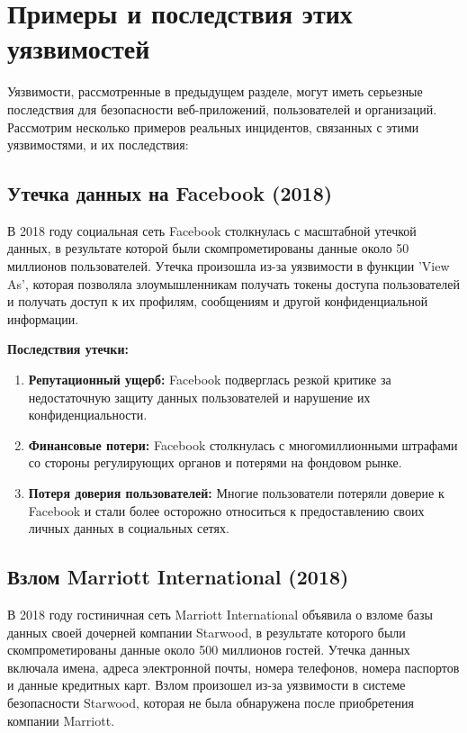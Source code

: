 \documentclass[a4paper,12pt]{diplom}
\begin{document}
	 
	 
	 
	 
	 
	 
	 
	 
	 
	 
	 
	 \section{Примеры и последствия этих уязвимостей}
	 
	 Уязвимости, рассмотренные в предыдущем разделе, могут иметь серьезные последствия для безопасности веб-приложений, пользователей и организаций. Рассмотрим несколько примеров реальных инцидентов, связанных с этими уязвимостями, и их последствия:
	 
	 \subsection{Утечка данных на Facebook (2018)}
	 
	 В 2018 году социальная сеть Facebook столкнулась с масштабной утечкой данных, в результате которой были скомпрометированы данные около 50 миллионов пользователей. Утечка произошла из-за уязвимости в функции 'View As', которая позволяла злоумышленникам получать токены доступа пользователей и получать доступ к их профилям, сообщениям и другой конфиденциальной информации.\cite{Facebook_attack}
	 
	 \textbf{Последствия утечки:}
	 
	 \begin{enumerate}[label=\arabic{enumi})]
	 	\item \textbf{Репутационный ущерб:}  Facebook подверглась резкой критике за недостаточную защиту данных пользователей и нарушение их конфиденциальности.
	 	\item \textbf{Финансовые потери:}  Facebook столкнулась с многомиллионными штрафами со стороны регулирующих органов и потерями на фондовом рынке.
	 	\item \textbf{Потеря доверия пользователей:}  Многие пользователи потеряли доверие к Facebook и стали более осторожно относиться к предоставлению своих личных данных в социальных сетях.
	 \end{enumerate}
	 
	 \subsection{Взлом Marriott International (2018)}
	 
	 В 2018 году гостиничная сеть Marriott International объявила о взломе базы данных своей дочерней компании Starwood, в результате которого были скомпрометированы данные около 500 миллионов гостей.  Утечка данных включала имена, адреса электронной почты, номера телефонов, номера паспортов и данные кредитных карт.  Взлом произошел из-за уязвимости в системе безопасности Starwood, которая не была обнаружена после приобретения компании Marriott.\cite{Marriott_International_attack}
	 
\end{document}
